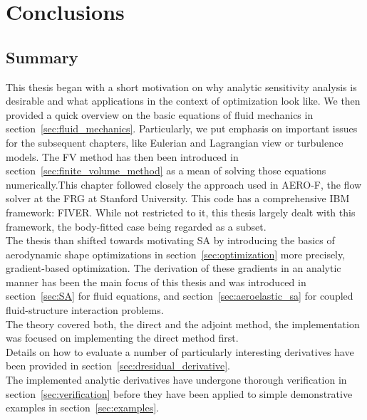 \documentclass[../main.tex]{subfiles}
\begin{document}
\setlength{\delimitershortfall}{0pt}

\FloatBarrier 
\chapter{Conclusions}\label{sec:conclusions}
\minitoc

\section{Summary}\label{sec:summary}
This thesis began with a short motivation on why analytic sensitivity analysis is desirable and what applications in the context of optimization look like. We then provided a quick overview on the basic equations of fluid mechanics in section~\ref{sec:fluid_mechanics}. Particularly, we put emphasis on important issues for the subsequent chapters, like Eulerian and Lagrangian view or turbulence models.
The \acf{FV} method has then been introduced in section~\ref{sec:finite_volume_method} as a mean of solving those equations numerically.This chapter followed closely the  approach used in AERO-F\cite{Aerof}, the flow solver at the \acf{FRG} at Stanford University. This code has a comprehensive \acf{IBM} framework: \acf{FIVER}\cite{Main2014}. While not restricted to it, this thesis largely dealt with this framework, the body-fitted case being regarded as a subset.\\
The thesis than shifted towards motivating \acf{SA} by introducing the basics of aerodynamic shape optimizations in section~\ref{sec:optimization} more precisely, gradient-based optimization.
The derivation of these gradients in an analytic manner has been the main focus of this thesis and was introduced in section~\ref{sec:SA} for fluid equations, and section~\ref{sec:aeroelastic_sa} for coupled fluid-structure interaction problems.\\
The theory covered both, the direct and the adjoint method, the implementation was focused on implementing the direct method first.\\
Details on how to evaluate a number of particularly interesting derivatives have been provided in section~\ref{sec:dresidual_derivative}.\\
The implemented analytic derivatives have undergone thorough verification in section~\ref{sec:verification} before they have been applied to simple demonstrative examples in section~\ref{sec:examples}.
\end{document}
